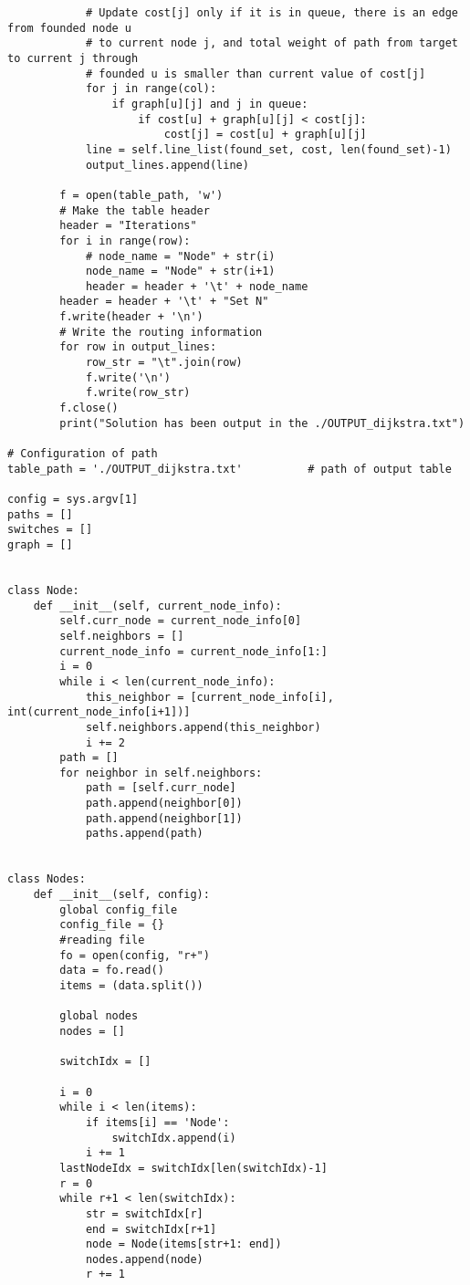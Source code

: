 \documentclass[12pt]{article}
\begin{document}
\begin{verbatim}
            # Update cost[j] only if it is in queue, there is an edge from founded node u
            # to current node j, and total weight of path from target to current j through
            # founded u is smaller than current value of cost[j]
            for j in range(col):
                if graph[u][j] and j in queue:
                    if cost[u] + graph[u][j] < cost[j]:
                        cost[j] = cost[u] + graph[u][j]
            line = self.line_list(found_set, cost, len(found_set)-1)
            output_lines.append(line)

        f = open(table_path, 'w')
        # Make the table header
        header = "Iterations"
        for i in range(row):
            # node_name = "Node" + str(i)
            node_name = "Node" + str(i+1)
            header = header + '\t' + node_name
        header = header + '\t' + "Set N"
        f.write(header + '\n')
        # Write the routing information
        for row in output_lines:
            row_str = "\t".join(row)
            f.write('\n')
            f.write(row_str)
        f.close()
        print("Solution has been output in the ./OUTPUT_dijkstra.txt")

# Configuration of path
table_path = './OUTPUT_dijkstra.txt'          # path of output table

config = sys.argv[1]
paths = []
switches = []
graph = []


class Node:
    def __init__(self, current_node_info):
        self.curr_node = current_node_info[0]
        self.neighbors = []
        current_node_info = current_node_info[1:]
        i = 0
        while i < len(current_node_info):
            this_neighbor = [current_node_info[i], int(current_node_info[i+1])]
            self.neighbors.append(this_neighbor)
            i += 2
        path = []
        for neighbor in self.neighbors:
            path = [self.curr_node]
            path.append(neighbor[0])
            path.append(neighbor[1])
            paths.append(path)


class Nodes:
    def __init__(self, config):
        global config_file
        config_file = {}
        #reading file
        fo = open(config, "r+")
        data = fo.read()
        items = (data.split())

        global nodes
        nodes = []

        switchIdx = []

        i = 0
        while i < len(items):
            if items[i] == 'Node':
                switchIdx.append(i)
            i += 1
        lastNodeIdx = switchIdx[len(switchIdx)-1]
        r = 0
        while r+1 < len(switchIdx):
            str = switchIdx[r]
            end = switchIdx[r+1]
            node = Node(items[str+1: end])
            nodes.append(node)
            r += 1


\end{verbatim}
\end{document}
